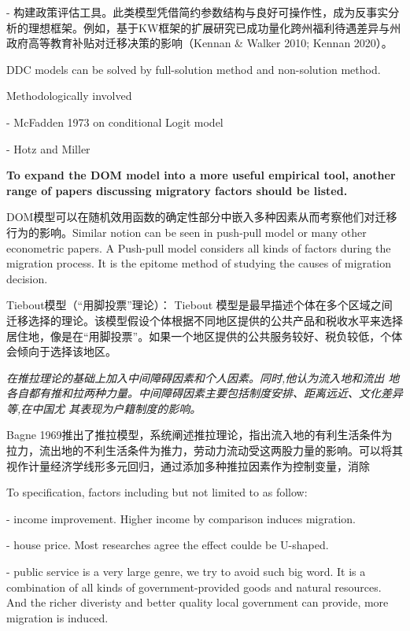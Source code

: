\documentclass[a4paper,12pt,oneside]{book} %
\begin{document}
- 构建政策评估工具。此类模型凭借简约参数结构与良好可操作性，成为反事实分析的理想框架。例如，基于KW框架的扩展研究已成功量化跨州福利待遇差异与州政府高等教育补贴对迁移决策的影响（Kennan \& Walker 2010; Kennan 2020）。









DDC models can be solved by full-solution method and non-solution method.

Methodologically involved

- McFadden 1973 on conditional Logit model

- Hotz and Miller 







\textbf{To expand the DOM model into a more useful empirical tool, another range of papers discussing migratory factors should be listed.}

DOM模型可以在随机效用函数的确定性部分中嵌入多种因素从而考察他们对迁移行为的影响。Similar notion can be seen in push-pull model or many other econometric papers. A Push-pull model considers all kinds of factors during the migration process. It is the epitome method of studying the causes of migration decision.

Tiebout模型（“用脚投票”理论）： Tiebout 模型是最早描述个体在多个区域之间迁移选择的理论。该模型假设个体根据不同地区提供的公共产品和税收水平来选择居住地，像是在“用脚投票”。如果一个地区提供的公共服务较好、税负较低，个体会倾向于选择该地区。

\cite{leeTheoryMigration1966}\textit{在推拉理论的基础上加入中间障碍因素和个人因素。同时,他认为流入地和流出  地各自都有推和拉两种力量。中间障碍因素主要包括制度安排、距离远近、文化差异等,在中国尤  其表现为户籍制度的影响。}

Bagne 1969推出了推拉模型，系统阐述推拉理论，指出流入地的有利生活条件为拉力，流出地的不利生活条件为推力，劳动力流动受这两股力量的影响。可以将其视作计量经济学线形多元回归，通过添加多种推拉因素作为控制变量，消除


To specification, factors including but not limited to as follow:

- income improvement. Higher income by comparison induces migration. 

- house price. Most researches agree the effect coulde be U-shaped.

- public service is a very large genre, we try to avoid such big word. It is a combination of all kinds of government-provided goods and natural resources. And the richer diveristy and better quality local government can provide, more migration is induced.
\end{document}
